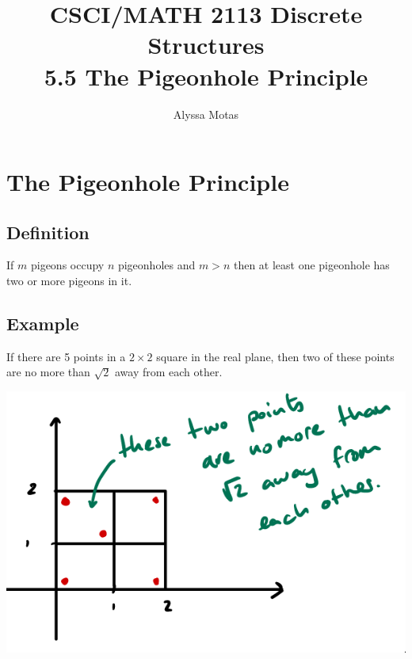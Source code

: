 \documentclass[11pt]{article}
\title{\textbf{CSCI/MATH 2113 Discrete Structures} \\ 5.5 The Pigeonhole Principle}
\author{Alyssa Motas}
\begin{document}
    \maketitle

    \pagebreak

    \tableofcontents

    \pagebreak

    \section{The Pigeonhole Principle}

    \subsection{Definition}

    If $m$ pigeons occupy $n$ pigeonholes and $m > n$ then at least one pigeonhole has two or more pigeons in it.

    \subsection{Example}

    If there are 5 points in a \(2 \times 2\) square in the real plane, then two of these points are no more than \(\sqrt{2}\) away from each other. 

    \begin{center}
        \includegraphics[scale=0.5]{ex.png}
    \end{center}
\end{document}
